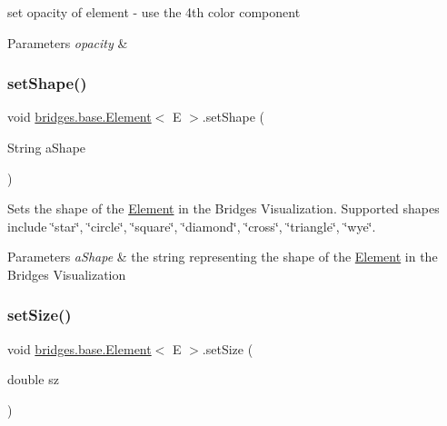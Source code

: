 set opacity of element -\/ use the 4th color component


\begin{DoxyParams}{Parameters}
{\em opacity} & \\
\hline
\end{DoxyParams}
\mbox{\label{classbridges_1_1base_1_1_element_ae65bfb47628e028c21c43553ef59b7a2}} 
\subsubsection{\texorpdfstring{setShape()}{setShape()}}
{\footnotesize\ttfamily void \mbox{\hyperlink{classbridges_1_1base_1_1_element}{bridges.\+base.\+Element}}$<$ E $>$.set\+Shape (\begin{DoxyParamCaption}\item[{String}]{a\+Shape }\end{DoxyParamCaption})}

Sets the shape of the \mbox{\hyperlink{classbridges_1_1base_1_1_element}{Element}} in the Bridges Visualization. Supported shapes include \char`\"{}star\char`\"{}, \char`\"{}circle\char`\"{}, \char`\"{}square\char`\"{}, \char`\"{}diamond\char`\"{}, \char`\"{}cross\char`\"{}, \char`\"{}triangle\char`\"{}, \char`\"{}wye\char`\"{}.


\begin{DoxyParams}{Parameters}
{\em a\+Shape} & the string representing the shape of the \mbox{\hyperlink{classbridges_1_1base_1_1_element}{Element}} in the Bridges Visualization \\
\hline
\end{DoxyParams}
\mbox{\label{classbridges_1_1base_1_1_element_a57153c203d8d2790650edb14ad61c338}} 
\subsubsection{\texorpdfstring{setSize()}{setSize()}}
{\footnotesize\ttfamily void \mbox{\hyperlink{classbridges_1_1base_1_1_element}{bridges.\+base.\+Element}}$<$ E $>$.set\+Size (\begin{DoxyParamCaption}\item[{double}]{sz }\end{DoxyParamCaption})}

